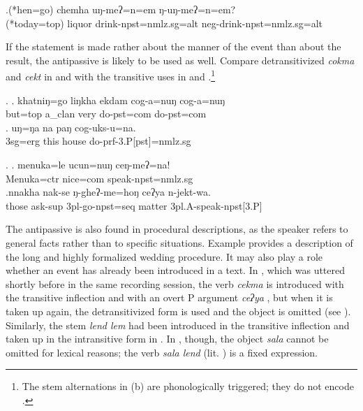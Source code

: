 	\exg.\label{ex-raksi}(*hen=go) chemha uŋ-meʔ=n=em ŋ-uŋ-meʔ=n=em?\\
(*today{\sc =top}) liquor  drink{\sc [3sg]-npst=nmlz.sg=alt} {\sc neg-}drink{\sc [3sg]-npst=nmlz.sg=alt}\\

If the statement is made rather about the manner of the event than about the result, the antipassive is likely to be used as well. Compare detransitivized \emph{cokma}  and \emph{cekt}  in \Next[a] and  \NNext[a] with the transitive uses in  \Next[b] and \NNext[b].\footnote{The stem alternations in (b) are phonologically triggered; they do not encode .}

\ex. \ag. khatniŋ=go liŋkha ekdam cog-a=nuŋ cog-a=nuŋ\\
but{\sc =top} a\_clan  very do{\sc [3sg]-pst=com} do{\sc [3sg]-pst=com}\\
 
\bg. uŋ=ŋa na paŋ cog-uks-u=na.\\
   {\sc 3sg=erg} this house   do{\sc -prf-3.P[pst]=nmlz.sg}\\

\ex. \ag. menuka=le ucun=nuŋ ceŋ-meʔ=na!\\
Menuka{\sc =ctr} nice{\sc =com} speak{\sc [3sg]-npst=nmlz.sg}\\
\bg.nnakha nak-se            ŋ-gheʔ-me=hoŋ          ceʔya n-jekt-wa.\\
		those ask{\sc -sup} {\sc 3pl-}go{\sc -npst=seq}	matter	{\sc 3pl.A-}speak{\sc -npst[3.P]}\\
	 


The antipassive is also found in procedural descriptions, as the speaker refers to general facts rather than to specific situations. Example \Next[a] provides  a description of the long and highly formalized wedding procedure. It may also play a role whether an event has  already been introduced in a text. In \Last[b], which was uttered shortly before \Next[a] in the same recording session, the verb \emph{cekma}  is introduced with the transitive inflection and with an overt P argument \emph{ceʔya} , but when it is taken up again, the detransitivized form is used and the object is omitted (see \Next[a]). Similarly, the stem \emph{lend \ti lem}  had been introduced in the transitive inflection and taken up in the intransitive form in  \Next[a]. In \Next[b], though, the object  \emph{sala} cannot be omitted for lexical reasons; the verb \emph{sala lend}  (lit. ) is a  fixed expression.

